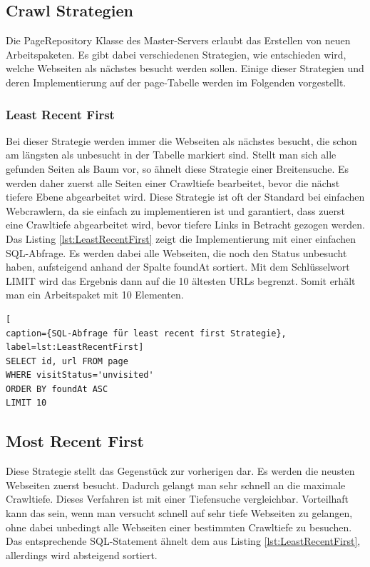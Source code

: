 \subsection{Crawl Strategien}
\label{subsec:CrawlStrategien}
Die PageRepository Klasse des Master-Servers erlaubt das Erstellen von neuen Arbeitspaketen. Es gibt dabei verschiedenen Strategien, wie entschieden wird, welche Webseiten als nächstes besucht werden sollen. Einige dieser Strategien und deren Implementierung auf der page-Tabelle werden im Folgenden vorgestellt.
\subsubsection{Least Recent First} 
Bei dieser Strategie werden immer die Webseiten als nächstes besucht, die schon am längsten als unbesucht in der Tabelle markiert sind. Stellt man sich alle gefunden Seiten als Baum vor, so ähnelt diese Strategie einer Breitensuche. Es werden daher zuerst alle Seiten einer Crawltiefe bearbeitet, bevor die nächst tiefere Ebene abgearbeitet wird. Diese Strategie ist oft der Standard bei einfachen Webcrawlern, da sie einfach zu implementieren ist und garantiert, dass zuerst eine Crawltiefe abgearbeitet wird, bevor tiefere Links in Betracht gezogen werden.\\
Das Listing \ref{lst:LeastRecentFirst} zeigt die Implementierung mit einer einfachen SQL-Abfrage. Es werden dabei alle Webseiten, die noch den Status unbesucht haben, aufsteigend anhand der Spalte foundAt sortiert. Mit dem Schlüsselwort LIMIT wird das Ergebnis dann auf die 10 ältesten URLs begrenzt. Somit erhält man ein Arbeitspaket mit 10 Elementen.
\begin{lstlisting}[
caption={SQL-Abfrage für least recent first Strategie},
label=lst:LeastRecentFirst]
SELECT id, url FROM page
WHERE visitStatus='unvisited'
ORDER BY foundAt ASC
LIMIT 10
\end{lstlisting}

\subsection{Most Recent First}  
Diese Strategie stellt das Gegenstück zur vorherigen dar. Es werden die neusten Webseiten zuerst besucht. Dadurch gelangt man sehr schnell an die maximale Crawltiefe. Dieses Verfahren ist mit einer Tiefensuche vergleichbar. Vorteilhaft kann das sein, wenn man versucht schnell auf sehr tiefe Webseiten zu gelangen, ohne dabei unbedingt alle Webseiten einer bestimmten Crawltiefe zu besuchen. Das entsprechende SQL-Statement ähnelt dem aus Listing \ref{lst:LeastRecentFirst}, allerdings wird absteigend sortiert.

